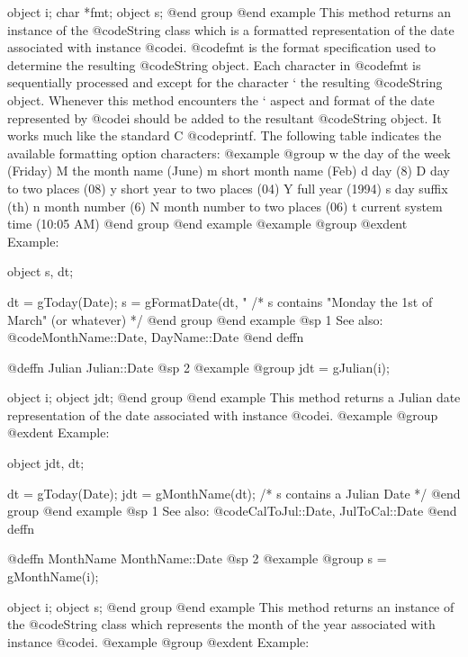 object  i;
char    *fmt;
object  s;
@end group
@end example
This method returns an instance of the @code{String} class which is a
formatted representation of the date associated with instance @code{i}.
@code{fmt} is the format specification used to determine the resulting
@code{String} object.  Each character in @code{fmt} is sequentially
processed and except for the character `%
the resulting @code{String} object.  Whenever this method encounters
the `%
aspect and format of the date represented by @code{i} should be added to
the resultant @code{String} object.  It works much like the standard C
@code{printf}.  The following table indicates the available formatting option
characters:
@example
@group
w       the day of the week (Friday)
M       the month name (June)
m       short month name (Feb)
d       day (8)
D       day to two places (08)
y       short year to two places (04)
Y       full year (1994)
s       day suffix (th)
n       month number (6)
N       month number to two places (06)
t       current system time (10:05 AM)
@end group
@end example
@example
@group
@exdent Example:

object  s, dt;

dt = gToday(Date);
s = gFormatDate(dt, "%
/*  s contains "Monday the 1st of March" (or whatever)  */
@end group
@end example
@sp 1
See also:  @code{MonthName::Date, DayName::Date}
@end deffn










@deffn {Julian} Julian::Date
@sp 2
@example
@group
jdt = gJulian(i);

object  i;
object  jdt;
@end group
@end example
This method returns a Julian date representation of the date
associated with instance @code{i}.
@example
@group
@exdent Example:

object  jdt, dt;

dt = gToday(Date);
jdt = gMonthName(dt);   /*  s contains a Julian Date  */
@end group
@end example
@sp 1
See also:  @code{CalToJul::Date, JulToCal::Date}
@end deffn








@deffn {MonthName} MonthName::Date
@sp 2
@example
@group
s = gMonthName(i);

object  i;
object  s;
@end group
@end example
This method returns an instance of the @code{String} class which represents
the month of the year associated with instance @code{i}.
@example
@group
@exdent Example:

